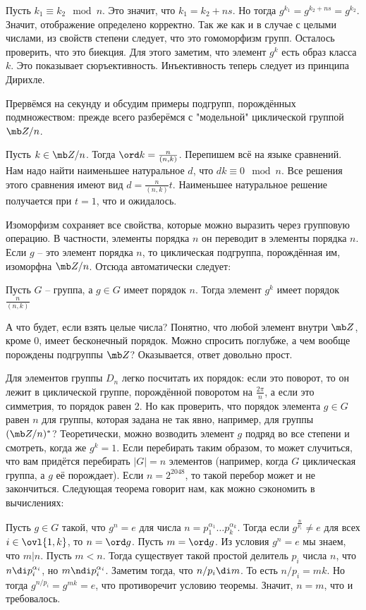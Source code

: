 Пусть $k_1\equiv k_2 \mod n$. Это значит, что $k_1=k_2+ns$. Но тогда $g^{k_1}=g^{k_2+ns}=g^{k_2}$. Значит, отображение определено корректно. Так же как и в случае с целыми числами, из свойств степени следует, что это гомоморфизм групп.   Осталось проверить, что это биекция. Для этого заметим, что элемент $g^k$ есть образ класса $k$. Это показывает сюръективность. Инъективность теперь следует из принципа Дирихле.
\endproof

Прервёмся на секунду и обсудим примеры подгрупп, порождённых подмножеством: прежде всего разберёмся с "модельной" циклической группой $\mb Z/n$.

\lm Пусть $k\in \mb Z/n$. Тогда $\ord k = \frac{n}{(n,k)}$. 
\elm
\proof Перепишем всё на языке сравнений. Нам надо найти наименьшее натуральное $d$, что $dk\equiv 0 \mod n$. Все решения этого сравнения имеют вид $d=\frac{n}{(n,k)}t$. Наименьшее натуральное решение получается при $t=1$, что и ожидалось.
\endproof

Изоморфизм сохраняет все свойства, которые можно выразить через групповую операцию. В частности, элементы порядка $n$ он переводит в элементы порядка $n$. Если $g$ -- это элемент порядка $n$, то циклическая подгруппа, порождённая им, изоморфна $\mb Z/n$. Отсюда автоматически следует: 

\crl Пусть $G$ -- группа, а $g\in G$ имеет порядок $n$. Тогда элемент $g^k$ имеет порядок $\frac{n}{(n,k)}$ 
\ecrl

А что будет, если взять целые числа? Понятно, что любой элемент внутри $\mb Z$, кроме $0$, имеет бесконечный порядок. Можно спросить поглубже, а чем вообще порождены подгруппы $\mb Z$? Оказывается, ответ довольно прост.

Для элементов группы $D_n$ легко посчитать их порядок: если это поворот, то он лежит в циклической группе, порождённой поворотом на $\frac{2\pi}{n}$, а если это симметрия, то порядок равен 2. Но как проверить, что порядок элемента  $g\in G$ равен $n$ для группы, которая задана не так явно, например, для группы $(\mb Z/n)^*$? Теоретически, можно возводить элемент $g$ подряд во все степени и смотреть, когда же $g^k=1$. Если перебирать таким образом, то может случиться, что вам придётся перебирать $|G|=n$ элементов (например, когда $G$ циклическая группа, а $g$ её порождает). Если $n=2^{2048}$, то такой перебор может и не закончиться. Следующая теорема говорит нам, как можно сэкономить в вычислениях:

\lm Пусть $g \in G$ такой, что $g^n=e$ для числа  $n=p_1^{\alpha_1}\dots p_k^{\alpha_k}$. Тогда если $g^{\frac{n}{p_i}}\neq e$ для всех $i\in\ovl{1,k}$, то $n=\ord g$. 
\elm
\proof Пусть $m=\ord g$. Из условия $g^n=e$ мы знаем, что $m | n$. Пусть $m<n$. Тогда существует такой простой делитель $p_i$ числа $n$, что $n\di p_i^{\alpha_i}$, но $m\ndi p_i^{\alpha_i}$. Заметим тогда, что $n/p_i \di m$. То есть $n/p_i=mk$. Но тогда $g^{n/p_i}=g^{mk}=e$, что противоречит условию теоремы. Значит, $n=m$, что и требовалось.
\endproof

